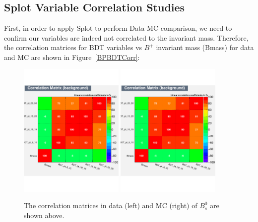 \subsection{\textbf{Splot} Variable Correlation Studies}

First, in order to apply Splot to perform Data-MC comparison, we need to confirm our variables are indeed not correlated to the invariant mass. Therefore, the correlation matrices for BDT variables vs $B^+$ invariant mass (Bmass) for data and MC are shown in Figure~\ref{BPBDTCorr}:


\begin{figure}[h]
\begin{center}
\includegraphics[width=0.45\textwidth]{Figures/Chapter5/BsBDTCorrB.pdf}
\includegraphics[width=0.45\textwidth]{Figures/Chapter5/BsBDTCorrB.pdf}
\caption{The correlation matrices in data (left) and MC (right) of $B^0_s$ are shown above.}
\label{BsBDTCorr}
\end{center}
\end{figure}

